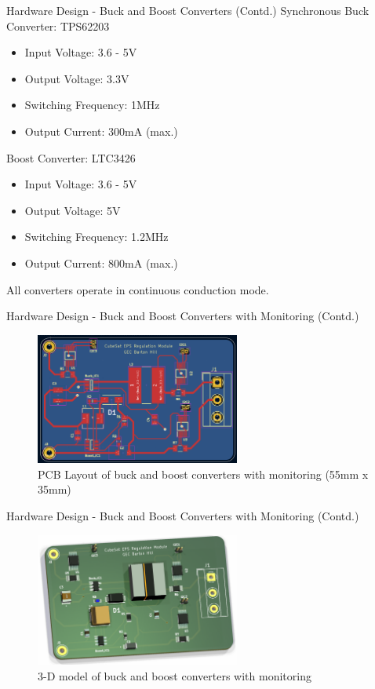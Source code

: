 \documentclass[aspectratio=169]{beamer}
\begin{document}
		\begin{frame}{Hardware Design - Buck and Boost Converters (Contd.)}
			Synchronous Buck Converter: TPS62203
			\begin{itemize}
			
				\item Input Voltage: 3.6 - 5V
				\item Output Voltage: 3.3V
				\item Switching Frequency: 1MHz
				\item Output Current: 300mA (max.)
			\end{itemize}
			Boost Converter: LTC3426
			\begin{itemize}
			
				\item Input Voltage: 3.6 - 5V
				\item Output Voltage: 5V
				\item Switching Frequency: 1.2MHz
				\item Output Current: 800mA (max.)
			\end{itemize}
			All converters operate in continuous conduction mode.
		\end{frame}
		\begin{frame}{Hardware Design - Buck and Boost Converters with Monitoring (Contd.) }
			\begin{figure}[h]
				\centering
				\includegraphics[width=0.6\textwidth]{diag/1 pcb.png}
				\caption{PCB Layout of buck and boost converters with monitoring (55mm x 35mm)}
				\label{fig:bubo}
			\end{figure}
		\end{frame}
		\begin{frame}{Hardware Design - Buck and Boost Converters with Monitoring (Contd.) }
			\begin{figure}[h]
				\centering
				\includegraphics[width=0.6\textwidth]{diag/1 3d.png}
				\caption{3-D model of buck and boost converters with monitoring}
				\label{fig:bubo}
			\end{figure}
		\end{frame}
		
\end{document}
